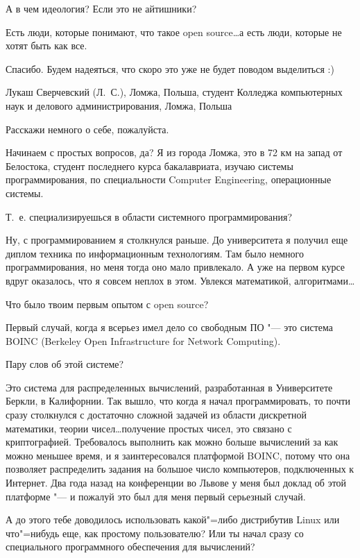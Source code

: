 \documentclass[10pt, a5paper]{article}
\begin{document}
\q А в чем идеология? Если это не айтишники?

\a Есть люди, которые понимают, что такое open source\ldots а есть люди, которые не хотят быть как все. 

\q Спасибо. Будем надеяться, что скоро это уже не будет поводом выделиться :)

\interview Лукаш Сверчевский (Л.~С.), Ломжа, Польша, студент Колледжа компьютерных наук и делового администрирования, Ломжа, Польша

\q Расскажи немного о себе, пожалуйста.

\a Начинаем с простых вопросов, да? Я из города Ломжа, это в 72 км на запад от Белостока, студент последнего курса бакалавриата, изучаю системы программирования,  по специальности Computer Engineering, операционные системы. 

\q Т.~е. специализируешься в области системного программирования?

\a Ну, с программированием я столкнулся раньше. До университета я получил еще диплом техника по информационным технологиям. Там было немного программирования, но меня тогда оно мало привлекало. А уже на первом курсе вдруг оказалось, что я совсем неплох в этом. Увлекся математикой, алгоритмами\ldots

\q Что было твоим первым опытом с open source?

\a Первый случай, когда я всерьез имел дело со свободным ПО "--- это система BOINC (Berkeley Open Infrastructure for Network Computing). 

\q Пару слов об этой системе?

\a Это система для распределенных вычислений, разработанная в Университете Беркли, в Калифорнии. Так вышло, что когда я начал программировать, то почти сразу столкнулся с достаточно сложной задачей из области дискретной математики, теории чисел\ldots получение простых чисел, это связано с криптографией. Требовалось выполнить как можно больше вычислений за как можно меньшее время, и я заинтересовался платформой BOINC, потому что она позволяет распределить задания на большое число компьютеров, подключенных к Интернет. Два года назад на конференции во Львове у меня был доклад об этой платформе "--- и пожалуй это был для меня первый серьезный случай.

\q А до этого тебе доводилось использовать какой"=либо дистрибутив Linux или что"=нибудь еще, как простому пользователю? Или ты начал сразу со специального программного обеспечения для вычислений?
\end{document}
